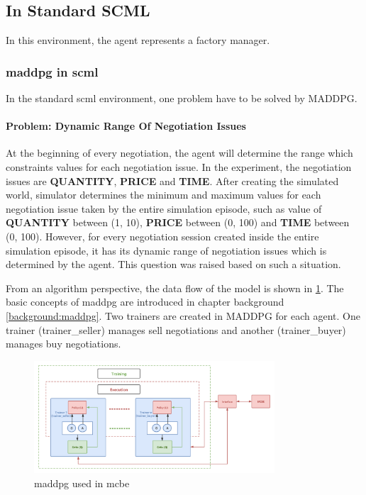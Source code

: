 \subsection{In Standard SCML}
In this environment, the agent represents a factory manager.

\subsubsection{\gls{maddpg} in \gls{scml}} \label{methods:maddpg}
In the standard scml environment, one problem have to be solved by MADDPG.

\paragraph{Problem: Dynamic Range Of Negotiation Issues}At the beginning of every negotiation, the agent will determine the range which constraints values for each negotiation issue. In the experiment, the negotiation issues are \textbf{QUANTITY}, \textbf{PRICE} and \textbf{TIME}. After creating the simulated world, simulator determines the minimum and maximum values for each negotiation issue taken by the entire simulation episode, such as value of \textbf{QUANTITY} between (1, 10), \textbf{PRICE} between (0, 100) and \textbf{TIME} between (0, 100). However, for every negotiation session created inside the entire simulation episode, it has its dynamic range of negotiation issues which is determined by the agent. This question was raised based on such a situation.

From an algorithm perspective, the data flow of the model is shown in \ref{fig:method-maddpg-scml}. The basic concepts of \gls{maddpg} are introduced in chapter background \ref{background:maddpg}. Two trainers are created in MADDPG for each agent. One trainer (trainer\_seller) manages sell negotiations and another (trainer\_buyer) manages buy negotiations. 

\begin{figure}[htbp]
\centering
\includegraphics[width=0.80\textwidth]{./images/scml-maddpg.png}
\caption{\gls{maddpg} used in \gls{mcbe}}
\label{fig:method-maddpg-scml}
\end{figure}


